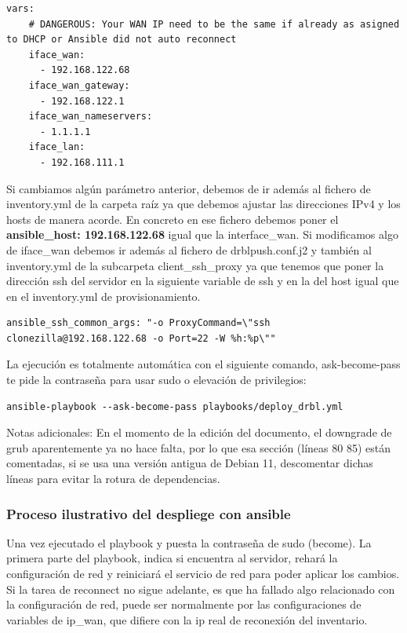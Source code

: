 \begin{lstlisting}[style=mybash]
	vars:
    # DANGEROUS: Your WAN IP need to be the same if already as asigned to DHCP or Ansible did not auto reconnect
    iface_wan:
      - 192.168.122.68
    iface_wan_gateway:
      - 192.168.122.1
    iface_wan_nameservers:
      - 1.1.1.1
    iface_lan:
      - 192.168.111.1
\end{lstlisting}

Si cambiamos algún parámetro anterior, debemos de ir además al fichero de inventory.yml de la carpeta raíz ya que debemos ajustar las direcciones IPv4 y los hosts de manera acorde. En concreto
en ese fichero debemos poner el \textbf{ansible\_host: 192.168.122.68} igual que la interface\_wan. Si modificamos algo de iface\_wan debemos ir además al fichero de drblpush.conf.j2 y 
también al inventory.yml de la subcarpeta client\_ssh\_proxy ya que  tenemos que poner la dirección ssh del servidor en la siguiente variable de ssh y en la del host igual que en el inventory.yml de provisionamiento.

\begin{lstlisting}[style=mybash]
ansible_ssh_common_args: "-o ProxyCommand=\"ssh clonezilla@192.168.122.68 -o Port=22 -W %h:%p\""
\end{lstlisting}

La ejecución es totalmente automática con el siguiente comando, ask-become-pass te pide la contraseña para usar sudo o elevación de privilegios:
\begin{lstlisting}[style=mybash]
ansible-playbook --ask-become-pass playbooks/deploy_drbl.yml
\end{lstlisting}

Notas adicionales: En el momento de la edición del documento, el downgrade de grub aparentemente ya no hace falta, por lo que esa sección (líneas 80 85) están comentadas,
si se usa una versión antigua de Debian 11, descomentar dichas líneas para evitar la rotura de dependencias.

\newpage
\subsubsection{Proceso ilustrativo del despliege con ansible}

Una vez ejecutado el playbook y puesta la contraseña de sudo (become). La primera parte del playbook, indica si encuentra al servidor, rehará la configuración de red y reiniciará 
el servicio de red para poder aplicar los cambios. Si la tarea de reconnect no sigue adelante, es que ha fallado algo relacionado con la configuración de red, puede ser normalmente
por las configuraciones de variables de ip\_wan, que difiere con la ip real de reconexión del inventario.

